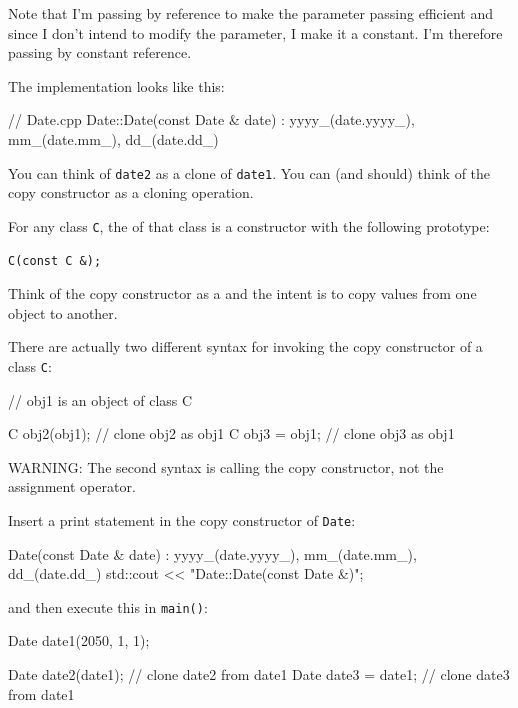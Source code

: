 Note that I'm passing by reference to make the parameter passing
efficient and since I don't intend to modify the parameter, I make it a
constant. I'm therefore passing by constant reference.

The implementation looks like this:

\begin{consolethree}[escapeinside=||]
// Date.cpp
Date::Date(const Date & date)
    : yyyy_(date.yyyy_), mm_(date.mm_), dd_(date.dd_)
{}
\end{consolethree}

You can think of \texttt{date2} as a clone of \texttt{date1}. You can (and
should) think of the copy constructor as a cloning operation.

For any class \texttt{C}, the  of that class is a
constructor with the following prototype:

\texttt{C(const C \&);}

Think of the copy constructor as a  and the
intent is to copy values from one object to another.



\newpage{}

There are actually two different syntax for invoking the copy
constructor of a class \texttt{C}:

\begin{consolethree}[escapeinside=||]
// obj1 is an object of class C

C obj2(obj1); // clone obj2 as obj1
C obj3 = obj1; // clone obj3 as obj1
\end{consolethree}

WARNING: The second syntax is calling the copy constructor, not the
assignment operator.

 Insert a print statement in the copy constructor of
\texttt{Date}:

\begin{consolethree}[escapeinside=||]
Date(const Date & date)
    : yyyy_(date.yyyy_), mm_(date.mm_), dd_(date.dd_)
{
    std::cout << "Date::Date(const Date &)\n";
}
\end{consolethree}

and then execute this in \texttt{main()}:

\begin{consolethree}[escapeinside=||]
Date date1(2050, 1, 1);

Date date2(date1);  // clone date2 from date1
Date date3 = date1; // clone date3 from date1
\end{consolethree}



